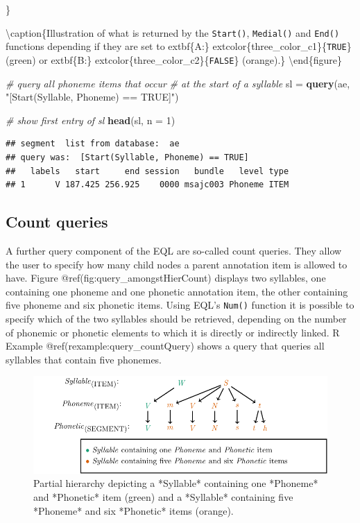 \documentclass[]{book}
\newenvironment{Shaded}{\begin{snugshade}}{\end{snugshade}}
\newcommand{\CommentTok}[1]{\textcolor[rgb]{0.56,0.35,0.01}{\textit{#1}}}
\newcommand{\DataTypeTok}[1]{\textcolor[rgb]{0.13,0.29,0.53}{#1}}
\newcommand{\DecValTok}[1]{\textcolor[rgb]{0.00,0.00,0.81}{#1}}
\newcommand{\KeywordTok}[1]{\textcolor[rgb]{0.13,0.29,0.53}{\textbf{#1}}}
\newcommand{\NormalTok}[1]{#1}
\newcommand{\StringTok}[1]{\textcolor[rgb]{0.31,0.60,0.02}{#1}}
\theoremstyle{definition}
\theoremstyle{definition}
\theoremstyle{definition}
\theoremstyle{remark}
\begin{document}
\}

\textbackslash{}caption\{Illustration of what is returned by the
\texttt{Start()}, \texttt{Medial()} and \texttt{End()} functions
depending if they are set to extbf\{A:\}
extcolor\{three\_color\_c1\}\{\texttt{TRUE}\} (green) or extbf\{B:\}
extcolor\{three\_color\_c2\}\{\texttt{FALSE}\}
(orange).\}\label{fig:query-positionSimple} \textbackslash{}end\{figure\}

\begin{Shaded}
\begin{Highlighting}[]
\CommentTok{# query all phoneme items that occur}
\CommentTok{# at the start of a syllable}
\NormalTok{sl =}\StringTok{ }\KeywordTok{query}\NormalTok{(ae, }\StringTok{"[Start(Syllable, Phoneme) == TRUE]"}\NormalTok{)}

\CommentTok{# show first entry of sl}
\KeywordTok{head}\NormalTok{(sl, }\DataTypeTok{n =} \DecValTok{1}\NormalTok{)}
\end{Highlighting}
\end{Shaded}

\begin{verbatim}
## segment  list from database:  ae 
## query was:  [Start(Syllable, Phoneme) == TRUE] 
##   labels   start     end session   bundle   level type
## 1      V 187.425 256.925    0000 msajc003 Phoneme ITEM
\end{verbatim}

\hypertarget{subsec:query_countQueries}{%
\subsection{Count queries}\label{subsec:query_countQueries}}

A further query component of the EQL are so-called count queries. They
allow the user to specify how many child nodes a parent annotation item
is allowed to have. Figure @ref(fig:query\_amongstHierCount) displays
two syllables, one containing one phoneme and one phonetic annotation
item, the other containing five phoneme and six phonetic items. Using
EQL's \texttt{Num()} function it is possible to specify which of the two
syllables should be retrieved, depending on the number of phonemic or
phonetic elements to which it is directly or indirectly linked. R
Example @ref(rexample:query\_countQuery) shows a query that queries all
syllables that contain five phonemes.

\begin{figure}

{\centering \includegraphics[width=0.75\linewidth]{pics/amongstHierCount} 

}

\caption{Partial hierarchy depicting a *Syllable* containing one *Phoneme* and  *Phonetic* item (green) and a *Syllable* containing five *Phoneme* and six *Phonetic* items (orange).}\label{fig:query-amongstHierCount}
\end{figure}
\end{document}
